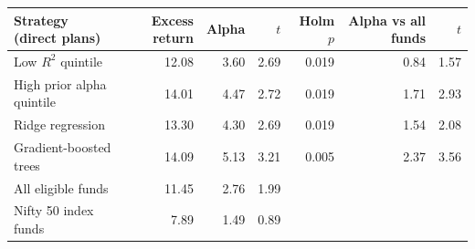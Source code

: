 \begin{tabular}{lrrrrrr}
\toprule
Strategy (direct plans) & Excess return & Alpha & $t$ & Holm $p$ & Alpha vs all funds & $t$ \\
\midrule
Low $R^2$ quintile & 12.08 & 3.60 & 2.69 & 0.019 & 0.84 & 1.57 \\
High prior alpha quintile & 14.01 & 4.47 & 2.72 & 0.019 & 1.71 & 2.93 \\
Ridge regression & 13.30 & 4.30 & 2.69 & 0.019 & 1.54 & 2.08 \\
Gradient-boosted trees & 14.09 & 5.13 & 3.21 & 0.005 & 2.37 & 3.56 \\
All eligible funds & 11.45 & 2.76 & 1.99 &  &  &  \\
Nifty 50 index funds & 7.89 & 1.49 & 0.89 &  &  &  \\
\bottomrule
\end{tabular}
